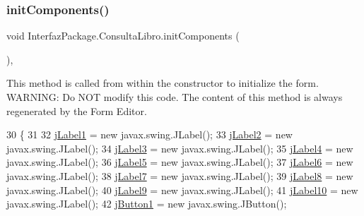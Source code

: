 \subsubsection{\texorpdfstring{init\+Components()}{initComponents()}}
{\footnotesize\ttfamily void Interfaz\+Package.\+Consulta\+Libro.\+init\+Components (\begin{DoxyParamCaption}{ }\end{DoxyParamCaption})\hspace{0.3cm}{\ttfamily [inline]}, {\ttfamily [private]}}

This method is called from within the constructor to initialize the form. W\+A\+R\+N\+I\+NG\+: Do N\+OT modify this code. The content of this method is always regenerated by the Form Editor. 
\begin{DoxyCode}
30                                   \{
31 
32         \mbox{\hyperlink{class_interfaz_package_1_1_consulta_libro_ac77c7946cb8103b592bd26c93868e6dc}{jLabel1}} = \textcolor{keyword}{new} javax.swing.JLabel();
33         \mbox{\hyperlink{class_interfaz_package_1_1_consulta_libro_af5b8586972d0b220d8fc909d2566798f}{jLabel2}} = \textcolor{keyword}{new} javax.swing.JLabel();
34         \mbox{\hyperlink{class_interfaz_package_1_1_consulta_libro_a3e4a05b55099ee80351bac56cdc1734b}{jLabel3}} = \textcolor{keyword}{new} javax.swing.JLabel();
35         \mbox{\hyperlink{class_interfaz_package_1_1_consulta_libro_a38c193843e6fdef8523b06eb32530cde}{jLabel4}} = \textcolor{keyword}{new} javax.swing.JLabel();
36         \mbox{\hyperlink{class_interfaz_package_1_1_consulta_libro_a49a4d4fb7a30f3fa6d4fe697b5bace17}{jLabel5}} = \textcolor{keyword}{new} javax.swing.JLabel();
37         \mbox{\hyperlink{class_interfaz_package_1_1_consulta_libro_aa7ab64f2b86ab31bd150020068712678}{jLabel6}} = \textcolor{keyword}{new} javax.swing.JLabel();
38         \mbox{\hyperlink{class_interfaz_package_1_1_consulta_libro_a218a7656528bb232eab4f384fed1254e}{jLabel7}} = \textcolor{keyword}{new} javax.swing.JLabel();
39         \mbox{\hyperlink{class_interfaz_package_1_1_consulta_libro_afc512066b447316ce167de196273232f}{jLabel8}} = \textcolor{keyword}{new} javax.swing.JLabel();
40         \mbox{\hyperlink{class_interfaz_package_1_1_consulta_libro_ae312eda737e35580e0221ddbd8c17292}{jLabel9}} = \textcolor{keyword}{new} javax.swing.JLabel();
41         \mbox{\hyperlink{class_interfaz_package_1_1_consulta_libro_aa72af154332185cfbed0dec73bd34450}{jLabel10}} = \textcolor{keyword}{new} javax.swing.JLabel();
42         \mbox{\hyperlink{class_interfaz_package_1_1_consulta_libro_a690d079d1efa9d0a7efd0cce09c7f375}{jButton1}} = \textcolor{keyword}{new} javax.swing.JButton();

\end{DoxyCode}

